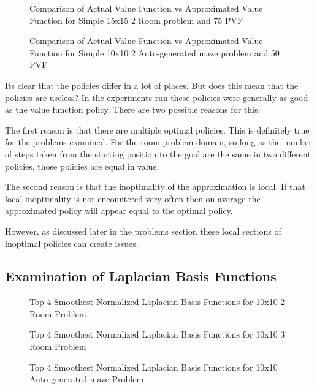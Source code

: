 \documentclass[12pt, letterpaper, final]{report}
\begin{document}
\FloatBarrier
\begin{figure}[h!]
\centering
\caption{Comparison of Actual Value Function vs Approximated Value
  Function for Simple 15x15 2 Room problem and 75 PVF}
\label{valueVsQ2}
\end{figure}
\FloatBarrier

\FloatBarrier
\begin{figure}[h!]
\centering
\caption{Comparison of Actual Value Function vs Approximated Value
  Function for Simple 10x10 2 Auto-generated maze problem and 50 PVF}
\label{valueVsQ3}
\end{figure}
\FloatBarrier

Its clear that the policies differ in a lot of places. But does this
mean that the policies are useless? In the experiments run these
policies were generally as good as the value function policy. There
are two possible reasons for this.

The first reason is that there are multiple optimal policies. This
is definitely true for the problems examined. For the room problem
domain, so long as the number of
steps taken from the starting position to the goal are the same in two
different policies, those policies are equal in value.

The second reason is that the inoptimality of the approximation is
local. If that local inoptimality is not encountered very often then
on average the approximated policy will appear equal to the optimal
policy.

However, as discussed later in the problems section these local
sections of inoptimal policies can create issues.

\subsection*{Examination of Laplacian Basis Functions}

\FloatBarrier
\begin{figure}[h!]
\centering
\caption{Top 4 Smoothest Normalized Laplacian Basis Functions for
  10x10 2 Room Problem}
\label{laplacianBasis1}
\end{figure}
\FloatBarrier

\FloatBarrier
\begin{figure}[h!]
\centering
\caption{Top 4 Smoothest Normalized Laplacian Basis Functions for
  10x10 3 Room Problem}
\label{laplacianBasis2}
\end{figure}
\FloatBarrier

\FloatBarrier
\begin{figure}[h!]
\centering
\caption{Top 4 Smoothest Normalized Laplacian Basis Functions for
  10x10 Auto-generated maze Problem}
\label{laplacianBasis3}
\end{figure}
\FloatBarrier
\end{document}
